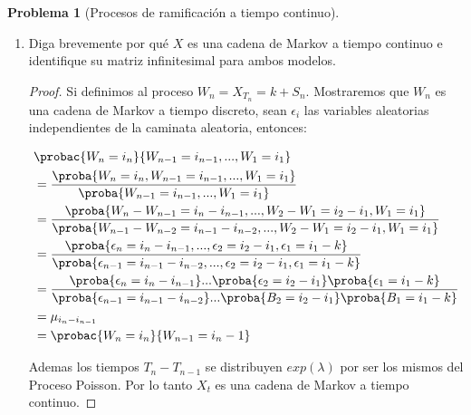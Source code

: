 \documentclass[a5paper,oneside]{amsart}
\theoremstyle{plain}
\theoremstyle{definition}
\newtheorem{problema}{Problema}
\begin{document}
\begin{problema}[Procesos de ramificaci\'on a tiempo continuo]
\begin{enumerate}
\begin{proof}
Entonces sean $S_1,S_2,...$ variables aleatorias exponenciales de par\'amaetro 1 y una cadena de markov $Z_n$ a tiempo discreto con matriz de transici\'on $P$. Definimos $T_0=0$ y $T_{n+1}=T_n+S_n/c(Z_n)$, definiendo a $X_t=Z_n$ si $[T_n,T_{n+1}]$ entonces $X_t$ es una cadena de Markov a tiempo continuo.

\end{proof}
Nuestro primer objetivo ser\'a encontrar una relaci\'on entre procesos de ramificaci\'on a tiempo continuo y procesos de Poisson compuestos. Sea $N$ un proceso de Poisson  y $S$ una caminata aleatoria independiente de $N$ tal que $\proba{S_1=j}=\mu_{j-1}$ \'o $\mu_{j}$ dependiendo de si estamos en el primer caso o en el segundo. Sea $k\geq 0$ y definamos a $X_t=k+S_{N_t}$.

\item Diga brevemente por qu\'e $X$ es una cadena de Markov a tiempo continuo e identifique su matriz infinitesimal para ambos modelos.

\begin{proof}

Si definimos al proceso $W_n=X_{T_n}=k+S_n$. Mostraremos que $W_n$ es una cadena de Markov a tiempo discreto, sean $\epsilon_i$ las variables aleatorias independientes de la caminata aleatoria, entonces:

\begin{align}
&\probac{W_n=i_n}{W_{n-1}=i_{n-1}, ..., W_1=i_1} \notag \\
&=\frac{\proba{W_n=i_n,W_{n-1}=i_{n-1}, ..., W_1=i_1}}{\proba{W_{n-1}=i_{n-1}, ..., W_1=i_1}} \notag \\
&=\frac{\proba{W_n-W_{n-1}=i_n-i_{n-1}, ..., W_2-W_1=i_2-i_1,W_1=i_1}}{\proba{W_{n-1}-W_{n-2}=i_{n-1}-i_{n-2}, ..., W_2-W_1=i_2-i_1,W_1=i_1}}\notag \\
&=\frac{\proba{\epsilon_n=i_n-i_{n-1}, ..., \epsilon_2=i_2-i_1,\epsilon_1=i_1-k}}{\proba{\epsilon_{n-1}=i_{n-1}-i_{n-2}, ..., \epsilon_2=i_2-i_1,\epsilon_1=i_1-k}}\notag \\
&=\frac{\proba{\epsilon_n=i_n-i_{n-1}} ...\proba{\epsilon_2=i_2-i_1}\proba{\epsilon_1=i_1-k}}{\proba{\epsilon_{n-1}=i_{n-1}-i_{n-2}} ...\proba{B_2=i_2-i_1}\proba{B_1=i_1-k}}\notag \\
&=\mu_{i_n-i_{n-1}} \notag \\
&=\probac{W_n=i_n}{W_{n-1}=i_n-1} \notag
\end{align}

Ademas los tiempos $T_n-T_{n-1}$ se distribuyen $exp(\lambda)$ por ser los mismos del Proceso Poisson. Por lo tanto $X_t$ es una cadena de Markov a tiempo continuo.


\end{proof}
\end{enumerate}
\end{problema}
\end{document}
